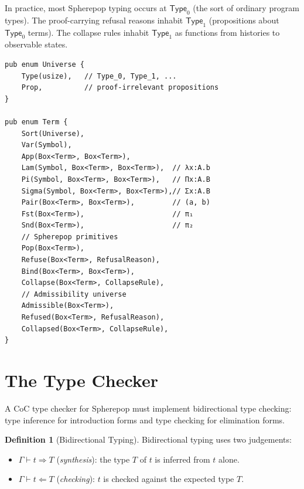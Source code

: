 \documentclass[12pt, a4paper, openany]{book}
\theoremstyle{plain}
\theoremstyle{definition}
\newtheorem{definition}[theorem]{Definition}
\theoremstyle{remark}
\begin{document}
In practice, most Spherepop typing occurs at $\mathsf{Type}_0$ (the sort of
ordinary program types). The proof-carrying refusal reasons inhabit
$\mathsf{Type}_1$ (propositions about $\mathsf{Type}_0$ terms). The collapse
rules inhabit $\mathsf{Type}_1$ as functions from histories to observable states.

\begin{lstlisting}[style=rust, caption={Universe levels in the Spherepop type checker}]
pub enum Universe {
    Type(usize),   // Type_0, Type_1, ...
    Prop,          // proof-irrelevant propositions
}

pub enum Term {
    Sort(Universe),
    Var(Symbol),
    App(Box<Term>, Box<Term>),
    Lam(Symbol, Box<Term>, Box<Term>),  // λx:A.b
    Pi(Symbol, Box<Term>, Box<Term>),   // Πx:A.B
    Sigma(Symbol, Box<Term>, Box<Term>),// Σx:A.B
    Pair(Box<Term>, Box<Term>),         // (a, b)
    Fst(Box<Term>),                     // π₁
    Snd(Box<Term>),                     // π₂
    // Spherepop primitives
    Pop(Box<Term>),
    Refuse(Box<Term>, RefusalReason),
    Bind(Box<Term>, Box<Term>),
    Collapse(Box<Term>, CollapseRule),
    // Admissibility universe
    Admissible(Box<Term>),
    Refused(Box<Term>, RefusalReason),
    Collapsed(Box<Term>, CollapseRule),
}
\end{lstlisting}

\section{The Type Checker}

A CoC type checker for Spherepop must implement bidirectional type checking:
type inference for introduction forms and type checking for elimination forms.

\begin{definition}[Bidirectional Typing]
Bidirectional typing uses two judgements:
\begin{itemize}
\item $\Gamma \vdash t \Rightarrow T$ (\emph{synthesis}): the type $T$ of $t$
is inferred from $t$ alone.
\item $\Gamma \vdash t \Leftarrow T$ (\emph{checking}): $t$ is checked against
the expected type $T$.
\end{itemize}
\end{definition}
\end{document}
